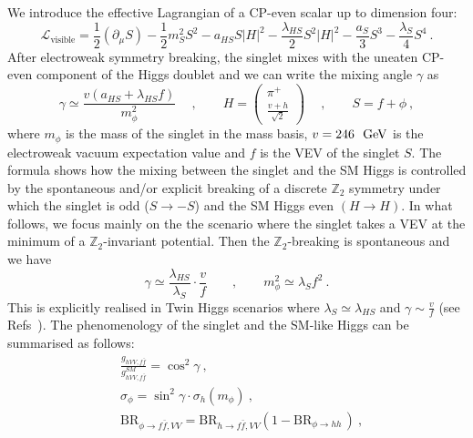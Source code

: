 We introduce the effective Lagrangian of a CP-even scalar up to dimension four:
\begin{equation}
\mathcal{L}_{\text{visible}}=\frac{1}{2}(\partial_\mu S)-\frac{1}{2} m_S^2 S^2-a_{HS} S\vert H\vert^2-\frac{\lambda_{HS}}{2} S^2\vert H\vert^2-\frac{a_S}{3} S^3-\frac{\lambda_S}{4} S^4\ .\label{eq:everybody}
\end{equation}
After electroweak symmetry breaking, the singlet mixes with the uneaten CP-even component of the Higgs doublet and we can write the mixing angle $\gamma$ as
\begin{equation}
\gamma\simeq\frac{v(a_{HS}+\lambda_{HS} f)}{m_\phi^2}\quad\ ,\qquad H=\begin{pmatrix}\pi^+\\ \frac{v+h}{\sqrt{2}}\end{pmatrix}\quad\ ,\qquad S=f+\phi\ ,
\end{equation}   
where $m_\phi$ is the mass of the singlet in the mass basis, $v=246\text{ \ensuremath{~\text{GeV}}}$ is the electroweak vacuum expectation value and $f$ is the VEV of the singlet $S$. The formula shows how the mixing between the singlet and the SM Higgs is controlled by the spontaneous and/or explicit breaking of a discrete $\mathbb{Z}_2$ symmetry under which the singlet is odd ($S\to -S$) and the SM Higgs even $(H\to H)$.  In what follows, we focus mainly on the the scenario where the singlet takes a VEV at the minimum of a $\mathbb{Z}_2$-invariant potential. Then the $\mathbb{Z}_2$-breaking is spontaneous and we have
\begin{equation}
\gamma\simeq \frac{\lambda_{HS}}{\lambda_S}\cdot\frac{v}{f}\qquad ,\qquad m_\phi^2\simeq \lambda_S f^2\ . \label{eq:mixing}
\end{equation} 
 This is explicitly realised in Twin Higgs scenarios where $\lambda_S\simeq \lambda_{HS}$ and $\gamma\sim \frac{v}{f}$ (see Refs~\cite{Chacko:2005pe,Barbieri:2005ri}). The phenomenology of the singlet and the SM-like Higgs can be summarised as follows:
\begin{align}
&\frac{g_{hVV,f\bar f}}{g_{hVV,f\bar f}^{SM}}=\cos^2\gamma \label{eq:SMHiggs}\ ,\\
&\sigma_\phi=\sin^2\gamma\cdot \sigma_{h}(m_\phi)\label{eq:Sproduction}\ ,\\
&\text{BR}_{\phi\to f\bar{f},VV}=\text{BR}_{h\to f\bar{f},VV}(1-\text{BR}_{\phi\to hh\ \label{eq:SBR}
})\ ,
\end{align}
